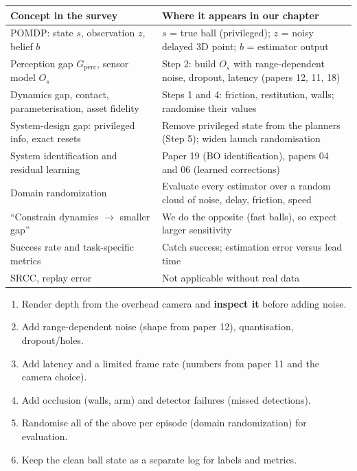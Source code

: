 \documentclass[11pt,a4paper]{article}
\begin{document}
\begin{center}
\renewcommand{\arraystretch}{1.25}
\begin{tabularx}{\textwidth}{@{}X X@{}}
\toprule
Concept in the survey & Where it appears in our chapter \\
\midrule
POMDP: state $s$, observation $z$, belief $b$ &
$s$ = true ball (privileged); $z$ = noisy delayed 3D point; $b$ = estimator output \\
Perception gap $G_{\mathrm{perc}}$, sensor model $O_s$ &
Step 2: build $O_s$ with range-dependent noise, dropout, latency (papers 12, 11, 18) \\
Dynamics gap, contact, parameterisation, asset fidelity &
Steps 1 and 4: friction, restitution, walls; randomise their values \\
System-design gap: privileged info, exact resets &
Remove privileged state from the planners (Step 5); widen launch randomisation \\
System identification and residual learning &
Paper 19 (BO identification), papers 04 and 06 (learned corrections) \\
Domain randomization &
Evaluate every estimator over a random cloud of noise, delay, friction, speed \\
``Constrain dynamics $\to$ smaller gap'' &
We do the opposite (fast balls), so expect larger sensitivity \\
Success rate and task-specific metrics &
Catch success; estimation error versus lead time \\
SRCC, replay error &
Not applicable without real data \\
\bottomrule
\end{tabularx}
\end{center}

\begin{ours}
\begin{enumerate}
\item Render depth from the overhead camera and \textbf{inspect it} before adding noise.
\item Add range-dependent noise (shape from paper 12), quantisation, dropout/holes.
\item Add latency and a limited frame rate (numbers from paper 11 and the camera choice).
\item Add occlusion (walls, arm) and detector failures (missed detections).
\item Randomise all of the above per episode (domain randomization) for evaluation.
\item Keep the clean ball state as a separate log for labels and metrics.
\end{enumerate}
\end{ours}
\end{document}
